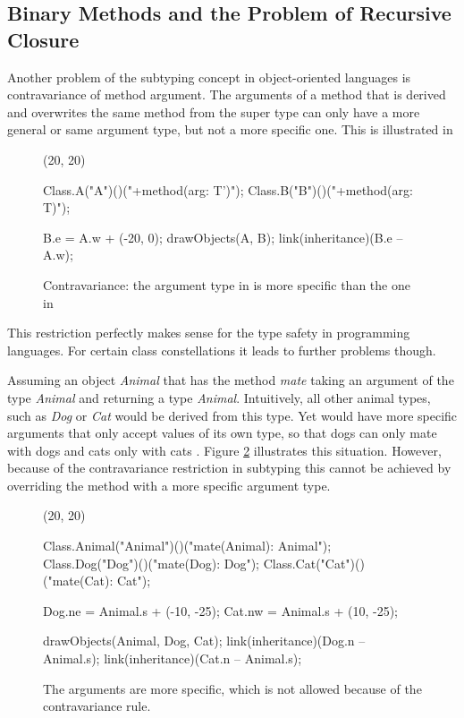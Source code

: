 \subsection{Binary Methods and the Problem of Recursive Closure}
\label{sec:recursiveClosure}
 Another problem of the subtyping concept in
object-oriented languages is contravariance of method argument. The
arguments of a method that is derived and overwrites the same method from
the super type can only have a more general or same argument type, but
not a more specific one. This is illustrated in 

\begin{figure}[H]
	\centering
	\begin{emp}[classdiag](20, 20)

		Class.A("A")()("+method(arg: T')");
		Class.B("B")()("+method(arg: T)");

		B.e = A.w + (-20, 0);
		drawObjects(A, B);
		link(inheritance)(B.e -- A.w);

	\end{emp}
	\caption[Contravariance of argument type in \B and \A]{Contravariance: the argument type in \B is more specific than the one in \A}
	\label{fig:contravariance}
\end{figure}

This restriction perfectly makes sense for the type safety in programming
languages. For certain class constellations it leads to further problems
though.

Assuming an object \emph{Animal} that has the method \emph{mate}
taking an argument of the type \emph{Animal} and returning a type
\emph{Animal}. Intuitively, all other animal types, such as \emph{Dog} or
\emph{Cat} would be derived from this type. Yet would have more specific
arguments that only accept values of its own type, so that dogs can only
mate with dogs and cats only with cats \cite{simons_theory_2003-1}. Figure
\ref{fig:animalContravariance} illustrates this situation. However,
because of the contravariance restriction in subtyping this cannot be
achieved by overriding the method with a more specific argument type.

\begin{figure}[H]
	\centering
	\begin{emp}[classdiag](20, 20)

		Class.Animal("Animal")()("mate(Animal): Animal");
		Class.Dog("Dog")()("mate(Dog): Dog");
		Class.Cat("Cat")()("mate(Cat): Cat");

		Dog.ne = Animal.s + (-10, -25);
		Cat.nw = Animal.s + (10, -25);

		drawObjects(Animal, Dog, Cat);
		link(inheritance)(Dog.n -- Animal.s);
		link(inheritance)(Cat.n -- Animal.s);

	\end{emp}
	\caption[More specific arguments]{The arguments are more specific, which is not allowed because of the contravariance rule.}
	\label{fig:animalContravariance}
\end{figure}

